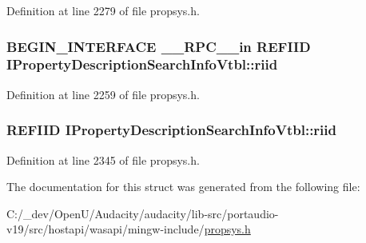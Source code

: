 Definition at line 2279 of file propsys.\+h.

\subsubsection[{\texorpdfstring{riid}{riid}}]{\setlength{\rightskip}{0pt plus 5cm}B\+E\+G\+I\+N\+\_\+\+I\+N\+T\+E\+R\+F\+A\+CE {\bf \+\_\+\+\_\+\+R\+P\+C\+\_\+\+\_\+in} {\bf R\+E\+F\+I\+ID} I\+Property\+Description\+Search\+Info\+Vtbl\+::riid}\hypertarget{struct_i_property_description_search_info_vtbl_a5d080456a99161da17b14da836d2ed1a}{}\label{struct_i_property_description_search_info_vtbl_a5d080456a99161da17b14da836d2ed1a}


Definition at line 2259 of file propsys.\+h.

\subsubsection[{\texorpdfstring{riid}{riid}}]{ {\bf R\+E\+F\+I\+ID} I\+Property\+Description\+Search\+Info\+Vtbl\+::riid}\hypertarget{struct_i_property_description_search_info_vtbl_a935a23bdaf1ba34257c0eb45f6569ec8}{}\label{struct_i_property_description_search_info_vtbl_a935a23bdaf1ba34257c0eb45f6569ec8}


Definition at line 2345 of file propsys.\+h.



The documentation for this struct was generated from the following file\+:\begin{DoxyCompactItemize}
\item 
C\+:/\+\_\+dev/\+Open\+U/\+Audacity/audacity/lib-\/src/portaudio-\/v19/src/hostapi/wasapi/mingw-\/include/\hyperlink{propsys_8h}{propsys.\+h}\end{DoxyCompactItemize}
